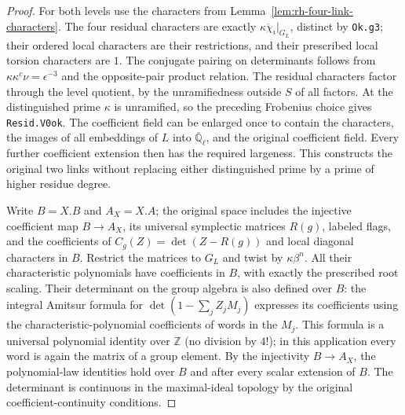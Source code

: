 \begin{proof}
For both levels use the characters from
Lemma~\ref{lem:rh-four-link-characters}. The four residual
characters are exactly $\overline{\kappa\chi_i}|_{G_L}$,
distinct by \texttt{Ok.g3}; their ordered local characters
are their restrictions, and their prescribed local torsion
characters are $1$. The conjugate pairing on determinants
follows from $\kappa\kappa^c\nu=\epsilon^{-3}$ and the
opposite-pair product relation. The residual characters
factor through the level quotient, by the unramifiedness
outside $S$ of all factors. At the distinguished prime
$\kappa$ is unramified, so the preceding Frobenius choice
gives \texttt{Resid.V0ok}. The coefficient field can be
enlarged once to contain the characters, the images of
all embeddings of $L$ into $\overline{\mathbb Q}_\ell$,
and the original coefficient field. Every further coefficient
extension then has the required largeness. This constructs
the original two links without replacing either distinguished
prime by a prime of higher residue degree.

Write $B=X.B$ and $A_X=X.A$; the original space includes
the injective coefficient map $B\to A_X$, its universal
symplectic matrices $R(g)$, labeled flags, and the
coefficients of $C_g(Z)=\det(Z-R(g))$ and local diagonal
characters in $B$. Restrict the matrices to $G_L$ and twist
by $\kappa\beta^n$. All their characteristic polynomials
have coefficients in $B$, with exactly the prescribed root
scaling. Their determinant on the group algebra is also
defined over $B$: the integral Amitsur formula for
$\det(1-\sum_j Z_j M_j)$ expresses its coefficients using
the characteristic-polynomial coefficients of words in
the $M_j$. This formula is a universal polynomial identity
over $\mathbb Z$ (no division by $4!$); in this application
every word is again the matrix of a group element. By the
injectivity $B\to A_X$, the polynomial-law identities hold
over $B$ and after every scalar extension of $B$.
The determinant is continuous in the maximal-ideal topology
by the original coefficient-continuity conditions.


\end{proof}
